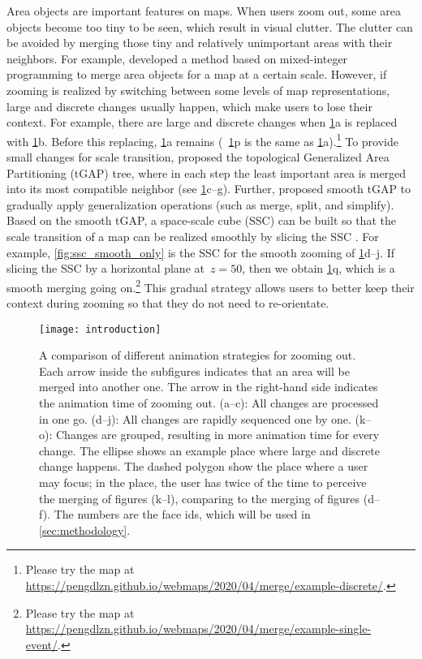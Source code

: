 \documentclass[ijgi,article,submit,moreauthors,pdftex]{Definitions/mdpi}
\begin{document}
Area objects are important features on maps. 
When users zoom out,
some area objects become too tiny to be seen,
which result in visual clutter.
The clutter can be avoided by merging 
those tiny and relatively unimportant areas with their neighbors.
For example, \citet{haunert2008f} developed a method based on
mixed-integer programming to merge area objects
for a map at a certain scale.
However, if zooming is realized by switching between
some levels of map representations, 
large and discrete changes usually happen, 
which make users to lose their context.
For example, there are large and discrete changes when
\fig\ref{fig:intro}a is replaced with \fig\ref{fig:intro}b.
Before this replacing, \fig\ref{fig:intro}a remains
(\eg~\fig\ref{fig:intro}p is the same as \fig\ref{fig:intro}a).\footnote{%
Please try the map at
\url{https://pengdlzn.github.io/webmaps/2020/04/merge/example-discrete/}.}
To provide small changes for scale transition, 
\citet{vanOosterom2005} proposed 
the topological Generalized Area Partitioning (tGAP) tree,
where in each step the least important area is merged into
its most compatible neighbor 
(see \figs\ref{fig:intro}c--g).
Further, \citet{vanOosterom2014Support} proposed smooth tGAP
to gradually apply generalization operations 
(such as merge, split, and simplify).
Based on the smooth tGAP, a space-scale cube (SSC) can be built so that 
the scale transition of a map can be realized smoothly
by slicing the SSC \citep[see][]{Meijers2020Web}.
For example, \fig\ref{fig:ssc_smooth_only} is the SSC 
for the smooth zooming of \figs\ref{fig:intro}d--j.
If slicing the SSC by a horizontal plane at~$z=50$,
then we obtain \fig\ref{fig:intro}q, 
which is a smooth merging going on.\footnote{%
Please try the map at
\url{https://pengdlzn.github.io/webmaps/2020/04/merge/example-single-event/}.}
This gradual strategy allows users 
to better keep their context during zooming
so that they do not need to re-orientate.


\begin{figure}[tb]
\centering
\texttt{[image: introduction]}
\caption{A comparison of different animation strategies for zooming out.
Each arrow inside the subfigures indicates that 
an area will be merged into another one.
The arrow in the right-hand side indicates the animation time of zooming out.
%
(a--c): All changes are processed in one go.
(d--j): All changes are rapidly sequenced one by one.
(k--o): Changes are grouped, resulting in more animation time for every change.
%
The ellipse shows an example place where large and discrete change happens.
The dashed polygon show the place where a user may focus;
in the place, the user has twice of the time to perceive the merging
of figures (k--l),
comparing to the merging of figures (d--f).
The numbers are the face ids, which will be used in \sect\ref{sec:methodology}.
}
\label{fig:intro}
\end{figure}
\end{document}
